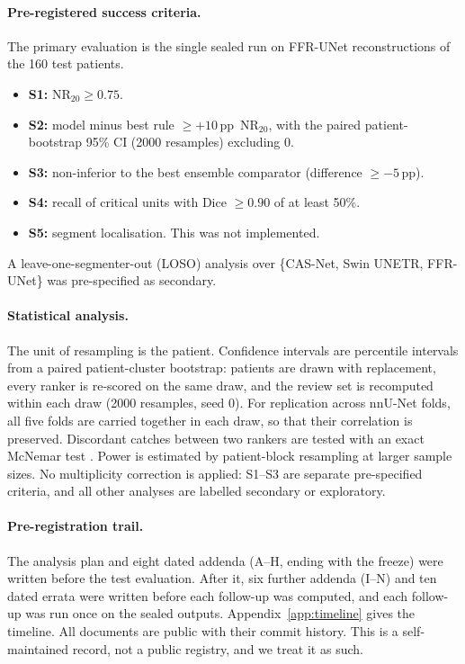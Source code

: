 \documentclass[11pt]{article}
\newcommand{\NR}{\mathrm{NR}_{20}}
\newcommand{\pp}{\,pp}
\begin{document}
\paragraph{Pre-registered success criteria.} The primary evaluation is the single sealed run on FFR-UNet reconstructions of the 160 test patients.
\begin{itemize}
\item \textbf{S1:} $\NR \geq 0.75$.
\item \textbf{S2:} model minus best rule $\geq +10$\pp\ $\NR$, with the paired patient-bootstrap 95\% CI (2000 resamples) excluding 0.
\item \textbf{S3:} non-inferior to the best ensemble comparator (difference $\geq -5$\pp).
\item \textbf{S4:} recall of critical units with Dice $\geq 0.90$ of at least 50\%.
\item \textbf{S5:} segment localisation. This was not implemented.
\end{itemize}
A leave-one-segmenter-out (LOSO) analysis over \{CAS-Net, Swin UNETR, FFR-UNet\} was pre-specified as secondary.

\paragraph{Statistical analysis.} The unit of resampling is the patient. Confidence intervals are percentile intervals from a paired patient-cluster bootstrap: patients are drawn with replacement, every ranker is re-scored on the same draw, and the review set is recomputed within each draw (2000 resamples, seed 0). For replication across nnU-Net folds, all five folds are carried together in each draw, so that their correlation is preserved. Discordant catches between two rankers are tested with an exact McNemar test \citep{mcnemar1947}. Power is estimated by patient-block resampling at larger sample sizes. No multiplicity correction is applied: S1--S3 are separate pre-specified criteria, and all other analyses are labelled secondary or exploratory.

\paragraph{Pre-registration trail.} The analysis plan and eight dated addenda (A--H, ending with the freeze) were written before the test evaluation. After it, six further addenda (I--N) and ten dated errata were written before each follow-up was computed, and each follow-up was run once on the sealed outputs. Appendix~\ref{app:timeline} gives the timeline. All documents are public with their commit history. This is a self-maintained record, not a public registry, and we treat it as such.
\end{document}
